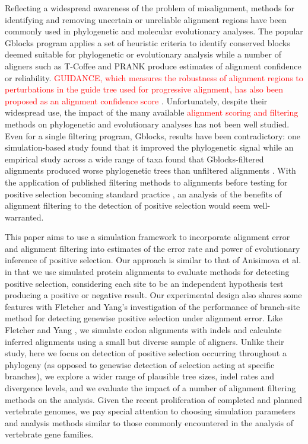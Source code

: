 \documentclass{article}
\begin{document}
Reflecting a widespread awareness of the problem of misalignment,
methods for identifying and removing uncertain or unreliable alignment
regions have been commonly used in phylogenetic and molecular
evolutionary analyses. The popular Gblocks program applies a set of
heuristic criteria to identify conserved blocks deemed suitable for
phylogenetic or evolutionary analysis \citep{Castresana2000Selection}
while a number of aligners such as T-Coffee
\citep{Notredame2000TCoffee} and PRANK
\citep{Loytynoja2008PhylogenyAware} produce estimates of alignment
confidence or reliability. \textcolor{red}{GUIDANCE, which measures
  the robustness of alignment regions to perturbations in the guide
  tree used for progressive alignment, has also been proposed as an
  alignment confidence score
  \citep{Penn2010Alignment}}. Unfortunately, despite their widespread
use, the impact of the many available \textcolor{red}{alignment
  scoring and filtering} methods on phylogenetic and evolutionary
analyses has not been well studied. Even for a single filtering
program, Gblocks, results have been contradictory: one
simulation-based study found that it improved the phylogenetic signal
\citep{Talavera2007Improvement} while an empirical study across a wide
range of taxa found that Gblocks-filtered alignments produced worse
phylogenetic trees than unfiltered alignments
\citep{Dessimoz2010Phylogenetic}. With the application of published
filtering methods to alignments before testing for positive selection
becoming standard practice
\citep{Studer2008Pervasive,Aguileta2009Rapidly}, an analysis of the
benefits of alignment filtering to the detection of positive selection
would seem well-warranted.

This paper aims to use a simulation framework to incorporate alignment
error and alignment filtering into estimates of the error rate and
power of \sw evolutionary inference of positive selection. Our
approach is similar to that of Anisimova et al.
\citeyearpar{Anisimova2002Accuracy} in that we use simulated protein
alignments to evaluate methods for detecting \sw positive selection,
considering each site to be an independent hypothesis test producing a
positive or negative result. Our experimental design also shares some
features with Fletcher and Yang's \citeyearpar{Fletcher2010Effect}
investigation of the performance of branch-site method for detecting
genewise positive selection under alignment error. Like Fletcher and
Yang \citeyearpar{Fletcher2010Effect}, we simulate codon alignments
with indels and calculate inferred alignments using a small but
diverse sample of aligners. Unlike their study, here we focus on \sw
detection of positive selection occurring throughout a phylogeny (as
opposed to genewise detection of selection acting at specific
branches), we explore a wider range of plausible tree sizes, indel
rates and divergence levels, and we evaluate the impact of a number of
alignment filtering methods on the \sw analysis. Given the recent
proliferation of completed and planned vertebrate genomes, we pay
special attention to choosing simulation parameters and analysis
methods similar to those commonly encountered in the \sw analysis of
vertebrate gene families.
\end{document}
